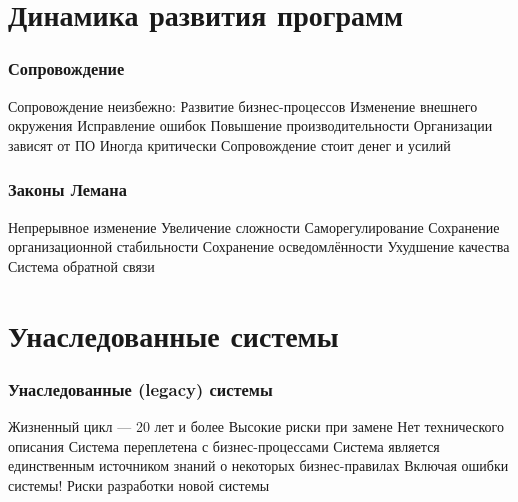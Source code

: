 \documentclass{../../slides-style}
\begin{document}
    \begin{frame}[plain]
        \titlepage
    \end{frame}

    \section{Динамика развития программ}

    \begin{frame}
        \frametitle{Сопровождение}
        \begin{outline}
            \1 Сопровождение неизбежно:
                \2 Развитие бизнес-процессов
                \2 Изменение внешнего окружения
                \2 Исправление ошибок
                \2 Повышение производительности
            \1 Организации зависят от ПО
                \2 Иногда критически
            \1 Сопровождение стоит денег и усилий
        \end{outline}
    \end{frame}

    \begin{frame}
        \frametitle{Законы Лемана}
        \begin{outline}
            \1 Непрерывное изменение
            \1 Увеличение сложности
            \1 Саморегулирование
            \1 Сохранение организационной стабильности
            \1 Сохранение осведомлённости
            \1 Ухудшение качества
            \1 Система обратной связи
        \end{outline}
    \end{frame}

    \section{Унаследованные системы}

    \begin{frame}
        \frametitle{Унаследованные (legacy) системы}
        \begin{outline}
            \1 Жизненный цикл --- 20 лет и более
            \1 Высокие риски при замене
                \2 Нет технического описания
                \2 Система переплетена с бизнес-процессами
                \2 Система является единственным источником знаний о некоторых бизнес-правилах
                    \3 Включая ошибки системы!
                \2 Риски разработки новой системы
        \end{outline}
    \end{frame}
\end{document}
